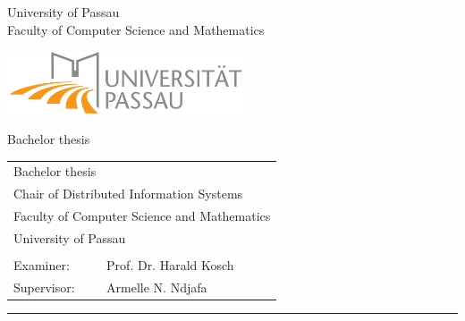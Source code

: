 \begin{titlepage}
\begin{singlespacing}
\begin{center}
\begin{flushleft}
	University of Passau\\
	Faculty of Computer Science and Mathematics
\end{flushleft}

\begin{center}

\vspace{1.0cm}

\includegraphics[width=7cm]{figures/uni-logo.png}

\vspace{2.5cm}


\Large{Bachelor thesis}

\vspace{1.0cm}

\begin{doublespace}
\textsf{{\Huge\textbf{\thetitle}}}
\end{doublespace}

\vspace{1.0cm}

{\bfseries \Large{\theauthor}}

\vfill
\end{center}



\vspace{3.0cm}

\normalsize
\begin{flushleft}
\begin{tabular}{ll}
\multicolumn{2}{l}{Bachelor thesis}\\
\multicolumn{2}{l}{Chair of Distributed Information Systems}\\
\multicolumn{2}{l}{Faculty of Computer Science and Mathematics}\\
\multicolumn{2}{l}{University of Passau}\\
\\
Examiner: & Prof. Dr. Harald Kosch \\
Supervisor: & Armelle N. Ndjafa
\end{tabular}
\end{flushleft}

\parbox{\linewidth}{\hrule\strut}

\thedate

\end{center}
\end{singlespacing}
\end{titlepage}
